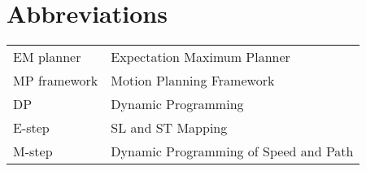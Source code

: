 \documentclass{report}
\begin{document}
  \section*{Abbreviations}
  \begin{tabular}{ll}
  EM planner  & Expectation Maximum Planner\\
  MP framework & Motion Planning Framework\\
  DP & Dynamic Programming\\
  E-step & SL and ST Mapping\\
  M-step & Dynamic Programming of Speed and Path
  
  \end{tabular}
  
 
 \newpage
 
 \listoffigures
 
 
 \tableofcontents
 
 
\end{document}
